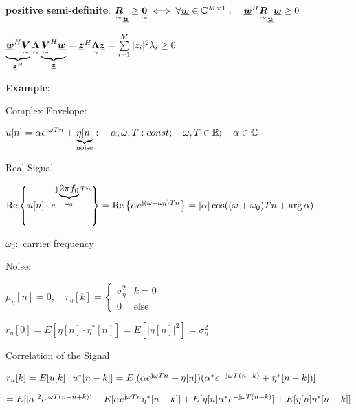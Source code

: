 \bigskip


\textbf{positive semi-definite}: $\underset{\sim}{\boldsymbol {R}}_{\underline{\boldsymbol {u}}}\geq \underset{\sim}{\boldsymbol {0}}\iff \forall \underline{\boldsymbol {w}} \in \mathbb{C}^{M\times 1}: \quad \underline{\boldsymbol {w}}^H\underset{\sim}{\boldsymbol {R}}_{\underline{\boldsymbol {u}}}\underline{\boldsymbol {w}}\geq 0$

\pfeil $\underbrace{\underline{\boldsymbol {w}}^H\underset{\sim}{\boldsymbol {V}}}_{\underline{\boldsymbol {z}}^H}\underset{\sim}{\boldsymbol {\Lambda}}\underbrace{\underset{\sim}{\boldsymbol {V}}^H\underline{\boldsymbol {w}}}_{\underline{\boldsymbol {z}}}=\underline{\boldsymbol {z}}^H\underset{\sim}{\boldsymbol {\Lambda}}\underline{\boldsymbol {z}}=
\sum\limits_{i=1}^M|z_i|^2\lambda_i\geq 0$\bigskip


\textbf{Example:}

Complex Envelope:

\quad$u[n]=\alpha e^{\mathrm{j} \omega T n} + \underbrace{\eta[n]}_{\textrm{noise}}: \quad \alpha,\omega,T: const;\quad \omega,T\in\mathbb{R}; \quad \alpha\in\mathbb{C}$

Real Signal

\quad $\operatorname{Re}\left\{u[n]\cdot e^{\mathrm{j} \underbrace{2 \pi f_0}_{\omega_0} T n}\right\}=\operatorname{Re}\left\{\alpha e^{\mathrm{j}(\omega+\omega_0)Tn}\right\}=|\alpha| \cos ((\omega+\omega_0)Tn + \arg \alpha)$

\with $\omega_0:$ 	carrier frequency

Noise:

\quad $\mu_\eta[n]=0, \quad r_\eta[k]=\left\lbrace \begin{matrix} \sigma_\eta^2 & k=0\\0&\textrm{else}\end{matrix} \right.$

\quad $r_\eta[0]=E[\eta[n]\cdot\eta^*[n]]=E[|\eta[n]|^2]=\sigma_\eta^2$

Correlation of the Signal

\quad $r_u[k]=E[u[k]\cdot u^*[n-k]]
=E[(\alpha e^{\mathrm{j} \omega T n} + \eta[n])(\alpha^* e^{-\mathrm{j} \omega T (n-k)} + \eta^*[n-k])]$

\quad $=E[|\alpha|^2 e^{\mathrm{j} \omega T (n-n+k)}]+E[\alpha e^{\mathrm{j} \omega T n}\eta^*[n-k]]+E[\eta[n]\alpha^* e^{-\mathrm{j} \omega T (n-k)}]+E[\eta[n]\eta^*[n-k]]$

